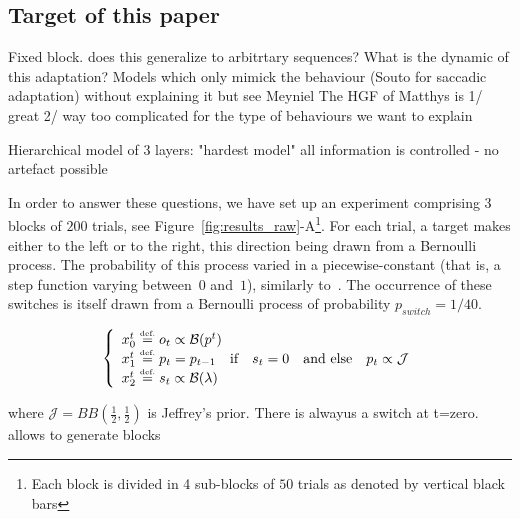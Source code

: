 \documentclass[profile,final,english, draft]{article}%
\newcommand{\choice}[1]{ %
	\left\{ %
		\begin{array}{l} #1 \end{array} %
	\right. }
\newcommand{\eqdef}{\ensuremath{\stackrel{\mbox{\upshape\tiny def.}}{=}}}
\newcommand{\eql}[1]{\begin{equation}#1\end{equation}}
\newcommand{\Bb}{\mathcal{B}}
\newcommand{\Jj}{\mathcal{J}}
\begin{document}
\subsection{Target of this paper}
Fixed block. does this generalize to arbitrtary sequences? What is the dynamic of this adaptation?
Models which only mimick the behaviour (Souto for saccadic adaptation) without explaining it but see Meyniel
The HGF of Matthys is 1/ great 2/ way too complicated for the type of behaviours we want to explain

Hierarchical model of 3 layers: "hardest model" all information is controlled - no artefact possible

In order to answer these questions, we have set up an experiment comprising $3$ blocks of $200$ trials, see Figure~\ref{fig:results_raw}-A\footnote{Each block is divided in 4 sub-blocks of $50$ trials as denoted by vertical black bars}. For each trial, a target makes either to the left or to the right, this direction being drawn from a Bernoulli process. The probability of this process varied in a piecewise-constant (that is, a step function varying between~$0$ and~$1$), similarly to~\textcite{Meyniel13}. The occurrence of these switches is itself drawn from a Bernoulli process of probability $p_{switch}=1/40$.

\eql{\choice{
x_0^t \eqdef o_t \propto \Bb(p^t) \\
x_1^t \eqdef p_t = p_{t-1} \quad \text{if} \quad s_t=0 \quad \text{and else} \quad p_t \propto \Jj \\
x_2^t \eqdef s_t \propto \Bb(\lambda) 
}}

where $\Jj = BB(\frac 1 2 , \frac 1 2 )$ is Jeffrey's prior. There is alwayus a switch at t=zero.
allows to generate blocks

%
%
% 
\end{document}

